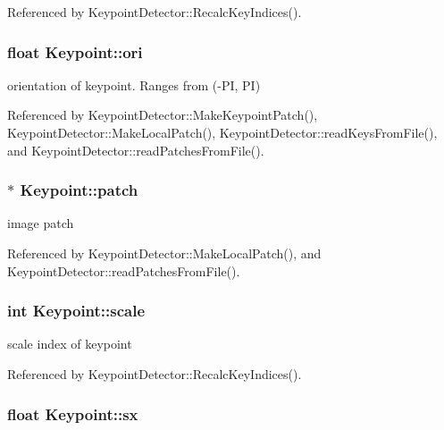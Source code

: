 Referenced by Keypoint\+Detector\+::\+Recalc\+Key\+Indices().

\subsubsection[{ori}]{\setlength{\rightskip}{0pt plus 5cm}float Keypoint\+::ori}\label{classKeypoint_a57cd0362fd3a20ddb5bad8f1909f2d61}


orientation of keypoint. Ranges from (-\/\+PI, PI) 



Referenced by Keypoint\+Detector\+::\+Make\+Keypoint\+Patch(), Keypoint\+Detector\+::\+Make\+Local\+Patch(), Keypoint\+Detector\+::read\+Keys\+From\+File(), and Keypoint\+Detector\+::read\+Patches\+From\+File().

\subsubsection[{patch}]{$\ast$ Keypoint\+::patch}\label{classKeypoint_ac2ac91266f8082104197c5e96cf0787a}


image patch 



Referenced by Keypoint\+Detector\+::\+Make\+Local\+Patch(), and Keypoint\+Detector\+::read\+Patches\+From\+File().

\subsubsection[{scale}]{\setlength{\rightskip}{0pt plus 5cm}int Keypoint\+::scale}\label{classKeypoint_a2bc4d3c108d7b794d7ce88072caf4aa1}


scale index of keypoint 



Referenced by Keypoint\+Detector\+::\+Recalc\+Key\+Indices().

\subsubsection[{sx}]{\setlength{\rightskip}{0pt plus 5cm}float Keypoint\+::sx}\label{classKeypoint_a74d20e9a26e7ab91c240c489d61d1d1e}


